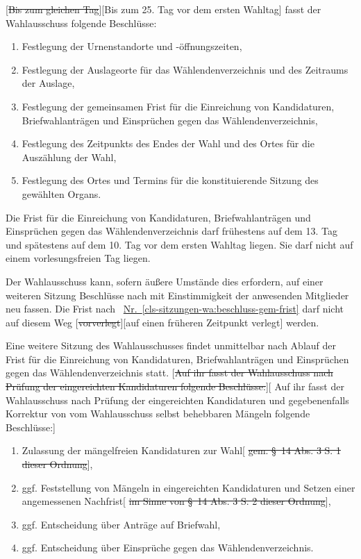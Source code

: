 \documentclass[%
draft,%
multilinesections%
]{fswo}
\newcommand\oldT[1]  {{\color{Gray}[\st{#1}]}}
\newcommand\newT[1]  {{\color{Green}[#1]}}
\newcommand\oldT[1]{}%
\newcommand\newT[1]{#1}
\newcommand\change[2]{\oldT{#1}\newT{#2}}
\newcommand*{\refItem}[1]{\hyperref[#1]{Nr.~\ref{#1}}}
\begin{document}
\begin{contract}
\change{Bis zum gleichen Tag}{Bis zum 25. Tag vor dem ersten Wahltag} fasst der Wahlausschuss folgende Beschlüsse:
\begin{enumerate}
\item Festlegung der Urnenstandorte und -öffnungszeiten,
\item Festlegung der Auslageorte für das Wählendenverzeichnis und des Zeitraums der Auslage,
\item Festlegung der gemeinsamen Frist für die Einreichung von Kandidaturen, Briefwahlanträgen und Einsprüchen gegen das Wählendenverzeichnis,\label{cls-sitzungen-wa:beschluss-gem-frist}
\item Festlegung des Zeitpunkts des Endes der Wahl und des Ortes für die Auszählung der Wahl,
\item Festlegung des Ortes und Termins für die konstituierende Sitzung des gewählten Organs.
\end{enumerate}
Die Frist für die Einreichung von Kandidaturen, Briefwahlanträgen und Einsprüchen gegen das Wählendenverzeichnis darf frühestens auf dem 13. Tag und spätestens auf dem 10. Tag vor dem ersten Wahltag liegen.
Sie darf nicht auf einem vorlesungsfreien Tag liegen.
\label{cls-sitzungen-wa:abs-wichtige-beschluesse}

Der Wahlausschuss kann, sofern äußere Umstände dies erfordern, auf einer weiteren Sitzung Beschlüsse nach  mit Einstimmigkeit der anwesenden Mitglieder neu fassen.
Die Frist nach ~\refItem{cls-sitzungen-wa:beschluss-gem-frist} darf nicht auf diesem Weg \change{vorverlegt}{auf einen früheren Zeitpunkt verlegt} werden.

Eine weitere Sitzung des Wahlausschusses findet unmittelbar nach Ablauf der Frist für die Einreichung von Kandidaturen, Briefwahlanträgen und Einsprüchen gegen das Wählendenverzeichnis statt.
\change{Auf ihr fasst der Wahlausschuss nach Prüfung der eingereichten Kandidaturen folgende Beschlüsse:}{%
Auf ihr fasst der Wahlausschuss nach Prüfung der eingereichten Kandidaturen und gegebenenfalls Korrektur von vom Wahlausschuss selbst behebbaren Mängeln folgende Beschlüsse:}
\begin{enumerate}
\item Zulassung der mängelfreien Kandidaturen zur Wahl\oldT{ gem. \S~14 Abs. 3 S. 1 dieser Ordnung},
\item ggf. Feststellung von Mängeln in eingereichten Kandidaturen und Setzen einer angemessenen Nachfrist\label{cls-sitzungen-wa:nachfrist}\oldT{ im Sinne von \S~14 Abs. 3 S. 2 dieser Ordnung},
\item ggf. Entscheidung über Anträge auf Briefwahl,
\item ggf. Entscheidung über Einsprüche gegen das Wählendenverzeichnis.
\end{enumerate}
\label{cls-sitzungen-wa:abs-beschluesse-fristende}


\end{contract}
\end{document}
